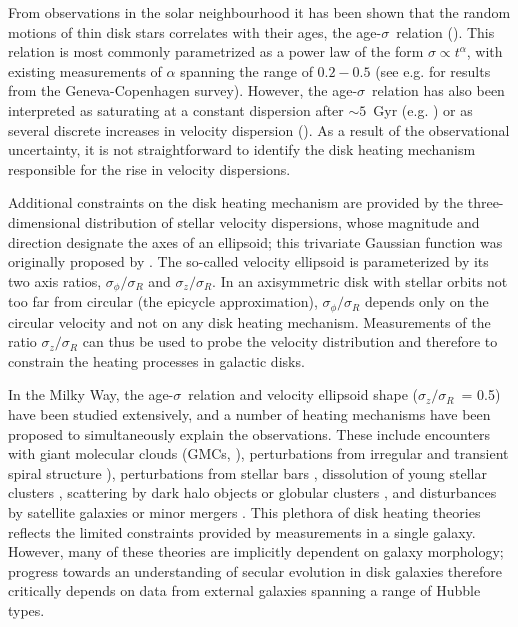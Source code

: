 \documentclass[useAMS,usenatbib]{mn2e}
\newcommand{\szsr}{$\sigma_z/\sigma_R$}
\newcommand{\ages}{age-$\sigma$}
\begin{document}
From observations in the solar neighbourhood it has been shown that the
random motions of thin disk stars correlates with their ages, the
\ages\ relation (\citealp{Wielen1977, Binney2000}).  This relation is
most commonly parametrized as a power law of the form $\sigma \propto
t^\alpha$, with existing measurements of $\alpha$ spanning the range of
$0.2-0.5$ (see e.g. \citealp{Nordstrom2004} for results from the
Geneva-Copenhagen survey).  However, the \ages\ relation has also been
interpreted as saturating at a constant dispersion after $\sim5$~Gyr
(e.g. \citealt{Carlberg1985, Seabroke2007, Soubiran2008}) or as several
discrete increases in velocity dispersion (\citealp{Quillen2001}).  As a
result of the observational uncertainty, it is not straightforward to
identify the disk heating mechanism responsible for the rise in velocity
dispersions.

Additional constraints on the disk heating mechanism are provided by the
three-dimensional distribution of stellar velocity dispersions, whose
magnitude and direction designate the axes of an ellipsoid; this
trivariate Gaussian function was originally proposed by
\citet{Schwarzschild1907}.  The so-called velocity ellipsoid is
parameterized by its two axis ratios, $\sigma_\phi / \sigma_R$ and
$\sigma_z / \sigma_R$.  In an axisymmetric disk with stellar orbits not
too far from circular (the epicycle approximation), $\sigma_\phi /
\sigma_R$ depends only on the circular velocity and not on any disk
heating mechanism. Measurements of the ratio $\sigma_z / \sigma_R$ can
thus be used to probe the velocity distribution and therefore to
constrain the heating processes in galactic disks.

In the Milky Way, the \ages\ relation and velocity ellipsoid shape
(\szsr\ = 0.5) have been studied extensively, and a number of heating
mechanisms have been proposed to simultaneously explain the
observations.  These include encounters with giant molecular clouds
(GMCs, \citealt{Spitzer1951, Lacey1984, Lacey1985}), perturbations from
irregular and transient spiral structure \citealt{Barbanis1967,
  Jenkins1990, Fuchs2001, Minchev2006}), perturbations from stellar bars
\citep{Saha2010}, dissolution of young stellar clusters
\citep{Kroupa2002}, scattering by dark halo objects or globular clusters
\citep{Hanninen2002, vandePutte2009}, and disturbances by satellite
galaxies or minor mergers \citep{Velazquez1999}.
%
This plethora of disk heating theories reflects the
limited constraints provided by measurements in a single galaxy.
However, many of these theories are implicitly dependent on galaxy
morphology; progress towards an understanding of secular evolution in
disk galaxies therefore critically depends on data from external
galaxies spanning a range of Hubble types.
\end{document}
